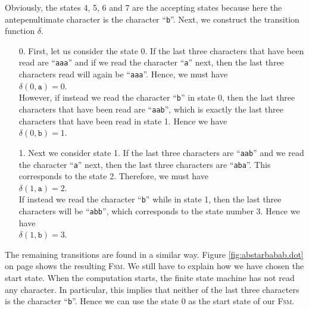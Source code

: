 Obviously, the states 4, 5, 6 and 7 are the accepting states because here the antepenultimate
character is the character ``\texttt{b}''.  Next, we construct the transition function $\delta$.
\begin{enumerate}
\item[0.] First, let us consider the state 0.  If the last three characters that have been read are
          ``\texttt{aaa}'' and if we read the character ``\texttt{a}'' next, then the last three
          characters read will again be ``\texttt{aaa}''.  Hence, we must have
          \\[0.2cm]
          \hspace*{1.3cm}
          $\delta(0, \mathtt{a}) = 0$.
          \\[0.2cm]
          However, if instead we read the character ``\texttt{b}'' in state 0, then the last three
          characters that have been read are ``\texttt{aab}'', which is exactly the last three
          characters that have been read in state 1.  Hence we have
          \\[0.2cm]
          \hspace*{1.3cm}
          $\delta(0, \mathtt{b}) = 1$.
\item[1.] Next we consider state 1.  If the last three characters are ``\texttt{aab}'' and we read
          the character ``\texttt{a}'' next, then the last three characters are ``\texttt{aba}''.
          This corresponds to the state  2.  Therefore, we must have
          \\[0.2cm]
          \hspace*{1.3cm}
          $\delta(1, \mathtt{a}) = 2$.
          \\[0.2cm]
          If instead we read the character  ``\texttt{b}'' while in state 1, then the last three
          characters will be ``\texttt{abb}'', which corresponds to the state number  3.  Hence we have
          \\[0.2cm]
          \hspace*{1.3cm}
          $\delta(1, \mathtt{b}) = 3$.
\end{enumerate}
The remaining transitions are found in a similar way.
Figure \ref{fig:abstarbabab.dot} on page \pageref{fig:abstarbabab.dot} shows the resulting \textsc{Fsm}.
We still have to explain how we have chosen the start state.  When the computation starts, the
finite state machine has not read any character.  In particular, this implies that neither of the
last three characters is the character ``\texttt{b}''.   Hence we can use the state 0 as the start
state of our \textsc{Fsm}.

